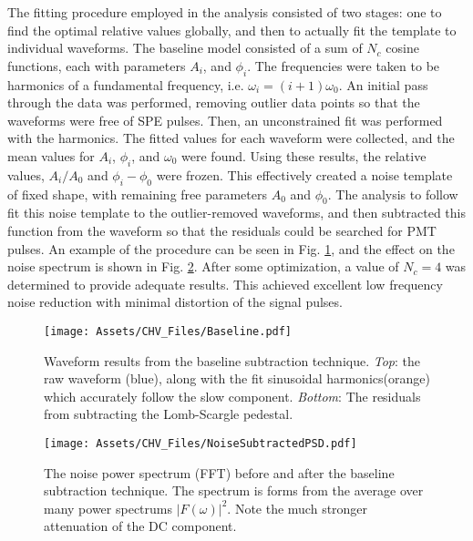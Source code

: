 The fitting procedure employed in the analysis consisted of two stages: one to find the optimal relative values globally, and then to actually fit the template to individual waveforms.
The baseline model consisted of a sum of $N_c$ cosine  functions, each with parameters $A_i$, and $\phi_i$. 
The frequencies were taken to be harmonics of a fundamental frequency, i.e. $\omega_i =(i+1)\omega_0 $.
An initial pass through the data was performed, removing outlier data points so that the waveforms were free of SPE pulses.
Then, an unconstrained fit was performed with the harmonics.
The fitted values for each waveform were collected, and the mean values for $A_i$, $\phi_i$, and $\omega_0$ were found.
Using these results, the relative values, $A_i/A_0$ and $\phi_i - \phi_0$ were frozen. 
This effectively created a noise template of fixed shape, with remaining free parameters $A_0$ and $\phi_0$.
The analysis to follow fit this noise template to the outlier-removed waveforms, and then subtracted this function from the waveform so that the residuals could be searched for PMT pulses.
An example of the procedure can be seen in Fig. \ref{fig:baseline}, and the effect on the noise spectrum is shown in Fig. \ref{fig:baseline_frequency}.
After some optimization, a value of $N_c=4$ was determined to provide adequate results.
This achieved excellent low frequency noise reduction with minimal distortion of the signal pulses.
\begin{figure}
    \centering
    \texttt{[image: Assets/CHV\_Files/Baseline.pdf]}
    \caption[Waveform results from the CHV baseline subtraction technique.]%
    {Waveform results from the baseline subtraction technique.
    \textit{Top}: the raw waveform (blue), along with the fit sinusoidal harmonics(orange) which accurately follow the slow component.
    \textit{Bottom}: The residuals from subtracting the Lomb-Scargle pedestal.}
    \label{fig:baseline}
\end{figure}
\begin{figure}
    \centering
    \texttt{[image: Assets/CHV\_Files/NoiseSubtractedPSD.pdf]}
    \caption[The noise power spectrum (FFT) before and after the baseline subtraction technique.]%
    {The noise power spectrum (FFT) before and after the baseline subtraction technique.
    The spectrum is forms from the average over many power spectrums $|F(\omega)|^2$.
    Note the much stronger attenuation of the DC component.}
    \label{fig:baseline_frequency}
\end{figure}


